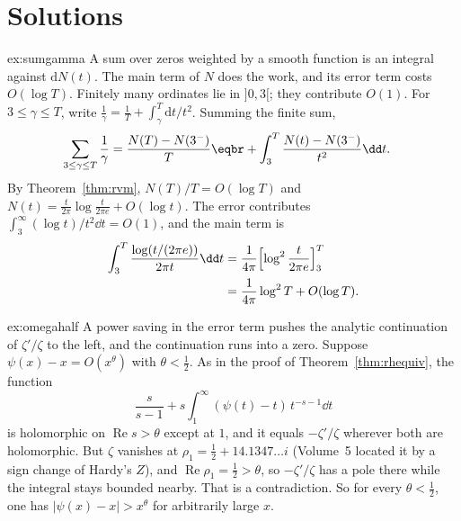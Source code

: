 \section{Solutions}

\begin{solution}{ex:sumgamma}
\idea A sum over zeros weighted by a smooth function is an integral against $\mathrm dN(t)$. The main term of $N$ does the work, and its error term costs $O(\log T)$.
\writeup Finitely many ordinates lie in $]0,3[$; they contribute $O(1)$. For $3\le\gamma\le T$, write $\frac1\gamma=\frac1T+\int_\gamma^T\mathrm dt/t^2$. Summing the finite sum,
\[
\begin{aligned}\sum_{3\le\gamma\le T}\frac1\gamma&=\frac{N(T)-N(3^-)}T\eqbr+\int_3^T\frac{N(t)-N(3^-)}{t^2}\dd t.\end{aligned}
\]
By Theorem~\ref{thm:rvm}, $N(T)/T=O(\log T)$ and $N(t)=\frac t{2\pi}\log\frac t{2\pi e}+O(\log t)$. The error contributes $\int_3^\infty(\log t)/t^2\dd t=O(1)$, and the main term is
\[
\begin{aligned}\int_3^T\frac{\log(t/(2\pi e))}{2\pi t}\dd t&=\frac1{4\pi}\Bigl[\log^2\frac t{2\pi e}\Bigr]_3^T\\&=\frac1{4\pi}\log^2T+O(\log T).\end{aligned}
\]
\end{solution}

\begin{solution}{ex:omegahalf}
\idea A power saving in the error term pushes the analytic continuation of $\zeta'/\zeta$ to the left, and the continuation runs into a zero.
\writeup Suppose $\psi(x)-x=O(x^\theta)$ with $\theta<\frac12$. As in the proof of Theorem~\ref{thm:rhequiv}, the function
\[
\frac s{s-1}+s\int_1^\infty(\psi(t)-t)\,t^{-s-1}\dd t
\]
is holomorphic on $\operatorname{Re}s>\theta$ except at $1$, and it equals $-\zeta'/\zeta$ wherever both are holomorphic. But $\zeta$ vanishes at $\rho_1=\frac12+14.1347\ldots i$ (Volume~5 located it by a sign change of Hardy's $Z$), and $\operatorname{Re}\rho_1=\frac12>\theta$, so $-\zeta'/\zeta$ has a pole there while the integral stays bounded nearby. That is a contradiction. So for every $\theta<\frac12$, one has $|\psi(x)-x|>x^\theta$ for arbitrarily large $x$.
\end{solution}

